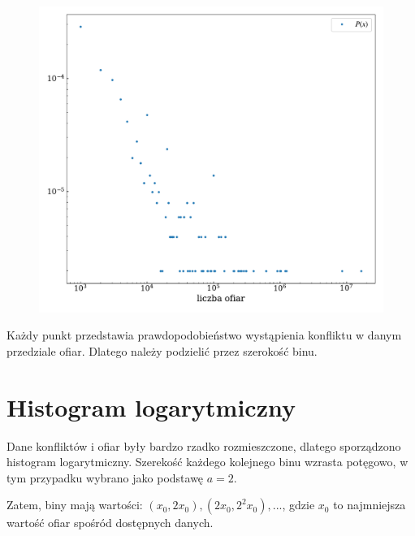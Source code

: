 \documentclass[13pt,a4paper]{article}
\begin{document}
\begin{figure}[ht!]
    \centering
    \includegraphics{./hist_prob.pdf}
\end{figure}

Każdy punkt przedstawia prawdopodobieństwo wystąpienia konfliktu w danym przedziale ofiar. Dlatego należy podzielić przez szerokość binu.


\pagebreak
\section{Histogram logarytmiczny}

Dane konfliktów i ofiar były bardzo rzadko rozmieszczone, dlatego sporządzono histogram logarytmiczny. Szerekość każdego kolejnego binu wzrasta potęgowo, w tym przypadku wybrano jako podstawę $a=2$.

Zatem, biny mają wartości: $(x_0, 2x_0), (2x_0, 2^2x_0), ...$, gdzie $x_0$ to najmniejsza wartość ofiar spośród dostępnych danych.
\end{document}
